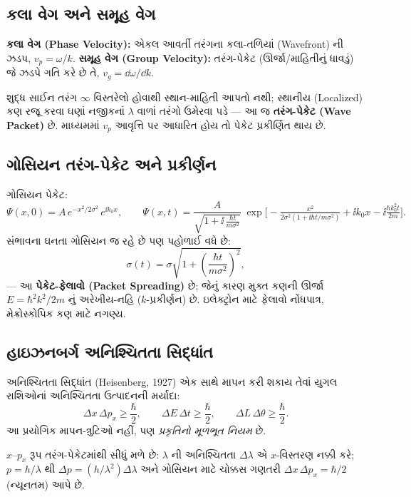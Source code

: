\subsection{કલા વેગ અને સમૂહ વેગ }
\begin{vayakhya}
\textbf{કલા વેગ (Phase Velocity):} એકલ આવર્તી તરંગના કલા-તળિયાં (Wavefront) ની ઝડપ,
$v_p=\omega/k$. \textbf{સમૂહ વેગ (Group Velocity):} તરંગ-પેકેટ (ઊર્જા/માહિતીનું ધાવડું) જે ઝડપે ગતિ કરે છે તે, $v_g=\dd\omega/\dd k$.
\end{vayakhya}

શુદ્ધ સાઈન તરંગ $\infty$ વિસ્તરેલો હોવાથી સ્થાન-માહિતી આપતો નથી; સ્થાનીય (Localized) કણ રજૂ કરવા ઘણાં નજીકનાં $\lambda$ વાળાં તરંગો ઉમેરવા પડે — આ જ \textbf{તરંગ-પેકેટ (Wave Packet)} છે. માધ્યમમાં $v_p$ આવૃત્તિ પર આધારિત હોય તો પેકેટ પ્રકીર્ણિત થાય છે.

\subsection{ગોસિયન તરંગ-પેકેટ અને પ્રકીર્ણન }
ગોસિયન પેકેટ:
\begin{equation}
\Psi(x,0)=A\,e^{-x^{2}/2\sigma^{2}}\,e^{\ii k_0 x},
\qquad \Psi(x,t)=\frac{A}{\sqrt{1+\ii\,\frac{\hbar t}{m\sigma^{2}}}}\;
\exp\!\Big[-\tfrac{x^{2}}{2\sigma^{2}(1+\ii\hbar t/m\sigma^{2})}+\ii k_0x-\ii\tfrac{\hbar k_0^{2}t}{2m}\Big].
\label{eq:gausspacket}
\end{equation}
સંભાવના ઘનતા ગોસિયન જ રહે છે પણ પહોળાઈ વધે છે:
\begin{equation}
\sigma(t)=\sigma\sqrt{1+\left(\frac{\hbar t}{m\sigma^{2}}\right)^{2}},
\label{eq:spreading}
\end{equation}
— આ \textbf{પેકેટ-ફેલાવો (Packet Spreading)} છે; જેનું કારણ મુક્ત કણની ઊર્જા $E=\hbar^2k^2/2m$ નું અરેખીય-નહિ ($k$-પ્રકીર્ણન) છે. ઇલેક્ટ્રોન માટે ફેલાવો નોંધપાત્ર, મેક્રોસ્કોપિક કણ માટે નગણ્ય.

\subsection{હાઇઝનબર્ગ અનિશ્ચિતતા સિદ્ધાંત }
\begin{sidhant}{અનિશ્ચિતતા સિદ્ધાંત (Heisenberg, 1927)}
એક સાથે માપન કરી શકાય તેવાં યુગલ રાશિઓનાં અનિશ્ચિતતા ઉત્પાદનની મર્યાદા:
\[
\Delta x\,\Delta p_x\ge\frac{\hbar}{2},\qquad
\Delta E\,\Delta t\ge\frac{\hbar}{2},\qquad
\Delta L\,\Delta\theta\ge\frac{\hbar}{2}.
\]
આ પ્રયોગિક માપન-ત્રુટિઓ નહીં, પણ \emph{પ્રકૃતિનો મૂળભૂત નિયમ} છે.
\end{sidhant}
$x$–$p_x$ રૂપ તરંગ-પેકેટમાંથી સીધું મળે છે: $\lambda$ ની અનિશ્ચિતતા $\Delta\lambda$ એ $x$-વિસ્તરણ નક્કી કરે; $p=h/\lambda$ થી $\Delta p=(h/\lambda^2)\Delta\lambda$ અને ગોસિયન માટે ચોક્કસ ગણતરી $\Delta x\,\Delta p_x=\hbar/2$ (ન્યૂનતમ) આપે છે.


